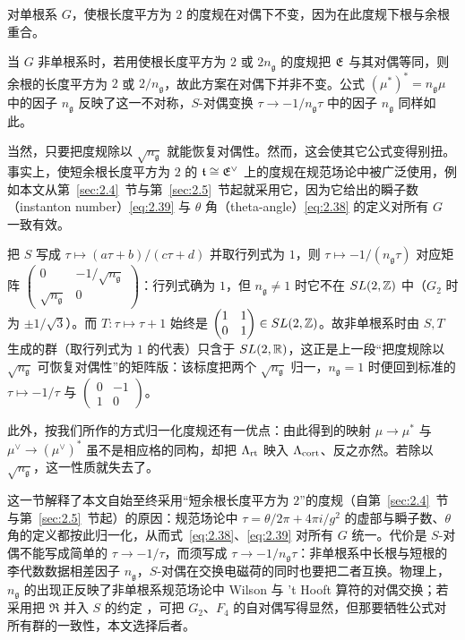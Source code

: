 \bigskip{}

对单根系 $G$，使根长度平方为 $2$ 的度规在对偶下不变，因为在此度规下根与余根重合。

当 $G$ 非单根系时，若用使根长度平方为 $2$ 或 $2n_{\mathfrak g}$ 的度规把 $\mathfrak{E}$ 与其对偶等同，则余根的长度平方为 $2$ 或 $2/n_{\mathfrak g}$，故此方案在对偶下并非不变。公式 $(\mu^*)^*=n_{\mathfrak g}\mu$ 中的因子 $n_{\mathfrak g}$ 反映了这一不对称，$S$-对偶变换 $\tau\to -1/n_{\mathfrak g}\tau$ 中的因子 $n_{\mathfrak g}$ 同样如此。

当然，只要把度规除以 $\sqrt{n_{\mathfrak g}}$ 就能恢复对偶性。然而，这会使其它公式变得别扭。事实上，使短余根长度平方为 $2$ 的 $\mathfrak t\cong \mathfrak{E}^\vee$ 上的度规在规范场论中被广泛使用，例如本文从第~\ref{sec:2.4}~节与第~\ref{sec:2.5}~节起就采用它，因为它给出的瞬子数（instanton number）\eqref{eq:2.39} 与 $\theta$ 角（theta-angle）\eqref{eq:2.38} 的定义对所有 $G$ 一致有效。

\begin{yizhu}[物理图像补充]
把 $S$ 写成 $\tau\mapsto(a\tau+b)/(c\tau+d)$ 并取行列式为 $1$，则 $\tau\mapsto-1/(n_{\mathfrak g}\tau)$ 对应矩阵 $\begin{pmatrix}0&-1/\sqrt{n_{\mathfrak g}}\\ \sqrt{n_{\mathfrak g}}&0\end{pmatrix}$：行列式确为 $1$，但 $n_{\mathfrak g}\neq1$ 时它不在 $SL(2,{\mathbb{Z}})$ 中（$G_2$ 时为 $\pm1/\sqrt3$）。而 $T:\tau\mapsto\tau+1$ 始终是 $\begin{pmatrix}1&1\\0&1\end{pmatrix}\in SL(2,{\mathbb{Z}})$。故非单根系时由 $S,T$ 生成的群（取行列式为 $1$ 的代表）只含于 $SL(2,{\mathbb{R}})$，这正是上一段“把度规除以 $\sqrt{n_{\mathfrak g}}$ 可恢复对偶性”的矩阵版：该标度把两个 $\sqrt{n_{\mathfrak g}}$ 归一，$n_{\mathfrak g}=1$ 时便回到标准的 $\tau\mapsto-1/\tau$ 与 $\begin{pmatrix}0&-1\\1&0\end{pmatrix}$。
\end{yizhu}

此外，按我们所作的方式归一化度规还有一优点：由此得到的映射 $\mu\to\mu^*$ 与 $\mu^\vee\to (\mu^\vee)^*$ 虽不是相应格的同构，却把 $\Lambda_{\rm rt}$ 映入 $\Lambda_{\rm cort}$、反之亦然。若除以 $\sqrt{n_{\mathfrak g}}$，这一性质就失去了。

\begin{yizhu}[物理图像补充]
这一节解释了本文自始至终采用“短余根长度平方为 $2$”的度规（自第~\ref{sec:2.4}~节与第~\ref{sec:2.5}~节起）的原因：规范场论中 $\tau=\theta/2\pi+4\pi i/g^2$ 的虚部与瞬子数、$\theta$ 角的定义都按此归一化，从而式~\eqref{eq:2.38}、\eqref{eq:2.39} 对所有 $G$ 统一。代价是 $S$-对偶不能写成简单的 $\tau\to-1/\tau$，而须写成 $\tau\to-1/n_{\mathfrak g}\tau$：非单根系中长根与短根的李代数数据相差因子 $n_{\mathfrak g}$，$S$-对偶在交换电磁荷的同时也要把二者互换。物理上，$n_{\mathfrak g}$ 的出现正反映了非单根系规范场论中 Wilson 与 't Hooft 算符的对偶交换；若采用把 $\mathfrak R$ 并入 $S$ 的约定 \cite{ref41,ref42}，可把 $G_2$、$F_4$ 的自对偶写得显然，但那要牺牲公式对所有群的一致性，本文选择后者。
\end{yizhu}

